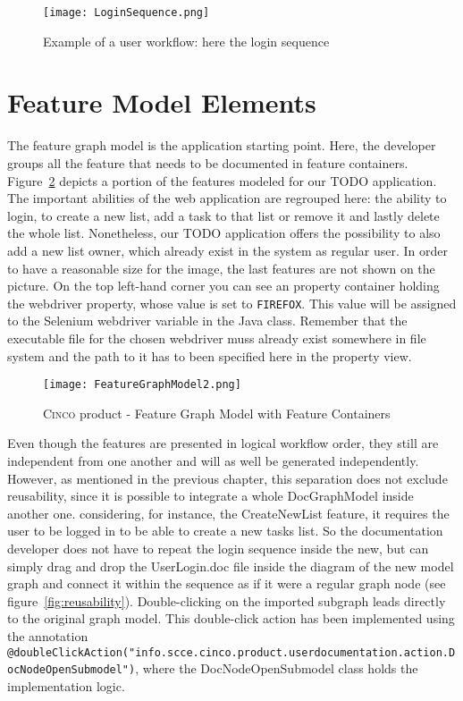 \begin{figure}[h]
    \centering
    \texttt{[image: LoginSequence.png]}
    \caption{Example of a user workflow: here the login sequence}
    \label{fig:loginSeq}
\end{figure}

\section{Feature Model Elements}\label{sec:FeatModElem}

The feature graph model is the application starting point. Here, the developer groups all the feature that needs to be documented in feature containers. Figure~\ref{fig:featGraph} depicts a portion of the features modeled for our TODO application. The important abilities of the web application are regrouped here: the ability to login, to create a new list, add a task to that list or remove it and lastly delete the whole list. Nonetheless, our TODO application offers the possibility to also add a new list owner, which already exist in the system as regular user. In order to have a reasonable size for the image, the last features are not shown on the picture. On the top left-hand corner you can see an property container holding the webdriver property, whose value is set to \lstinline[language=MGL]{FIREFOX}. This value will be assigned to the Selenium webdriver variable in the Java class. Remember that the executable file for the chosen webdriver muss already exist somewhere in file system and the path to it has to been specified here in the property view.

\begin{figure}[H]
    \centering
    \texttt{[image: FeatureGraphModel2.png]}
    \caption{\textsc{Cinco} product - Feature Graph Model with Feature Containers}
    \label{fig:featGraph}
\end{figure}

Even though the features are presented in logical workflow order, they still are independent from one another and will as well be generated independently. However, as mentioned in the previous chapter, this separation does not exclude reusability, since it is possible to integrate a whole DocGraphModel inside another one. considering, for instance, the CreateNewList feature, it requires the user to be logged in to be able to create a new tasks list. So the documentation developer does not have to repeat the login sequence inside the new, but can simply drag and drop the UserLogin.doc file inside the diagram of the new model graph and connect it within the sequence as if it were a regular graph node (see figure~\ref{fig:reusability}). Double-clicking on the imported subgraph leads directly to the original graph model. This double-click action has been implemented using the annotation \lstinline[language=MGL]{@doubleClickAction("info.scce.cinco.product.userdocumentation.action.DocNodeOpenSubmodel")}, where the DocNodeOpenSubmodel class holds the implementation logic.

